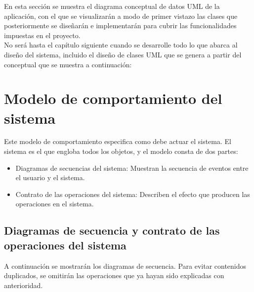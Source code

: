 En esta sección se muestra el diagrama conceptual de datos UML de la aplicación, con el que se visualizarán a modo de primer vistazo las clases que posteriormente se diseñarán e implementarán para cubrir las funcionalidades impuestas en el proyecto.\\

No será hasta el capítulo siguiente cuando se desarrolle todo lo que abarca al diseño del sistema, incluido el diseño de clases UML que se genera a partir del conceptual que se muestra a continuación:

\section{Modelo de comportamiento del sistema}

Este modelo de comportamiento especifica como debe actuar el sistema. El sistema es el que engloba todos los objetos, y el modelo consta de dos partes:

\begin{itemize}
\item Diagramas de secuencias del sistema: Muestran la secuencia de eventos entre el usuario y el sistema.
\item Contrato de las operaciones del sistema: Describen el efecto que producen las operaciones en el sistema.
\end{itemize}

\subsection{Diagramas de secuencia y contrato de las operaciones del sistema}

A continuación se mostrarán los diagramas de secuencia. Para evitar contenidos duplicados, se omitirán las operaciones que ya hayan sido explicadas con anterioridad.














